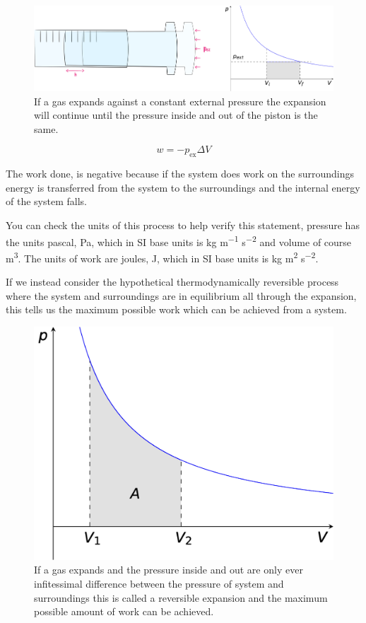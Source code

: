 \documentclass[
]{book}
\begin{document}
\begin{figure}

{\centering \includegraphics[width=1\linewidth]{images/irrevexpansion} 

}

\caption{If a gas expands against a constant external pressure the expansion will continue until the pressure inside and out of the piston is the same.}\label{fig:irrevexpansion}
\end{figure}

\begin{equation}
w=-p_{\textrm{ex}}\Delta V
\label{eq:irrevexpansion}
\end{equation}

The work done, is negative because if the system does work on the surroundings energy is transferred from the system to the surroundings and the internal energy of the system falls.

You can check the units of this process to help verify this statement, pressure has the units pascal, Pa, which in SI base units is kg m\textsuperscript{−1} s\textsuperscript{−2} and volume of course m\textsuperscript{3}. The units of work are joules, J, which in SI base units is kg m\textsuperscript{2} s\textsuperscript{−2}.

If we instead consider the hypothetical thermodynamically reversible process where the system and surroundings are in equilibrium all through the expansion, this tells us the maximum possible work which can be achieved from a system.

\begin{figure}

{\centering \includegraphics[width=0.5\linewidth]{images/revexpansion} 

}

\caption{If a gas expands and the pressure inside and out are only ever infitessimal difference between the pressure of system and surroundings this is called a reversible expansion and the maximum possible amount of work can be achieved.}\label{fig:revexpansion}
\end{figure}
\end{document}
